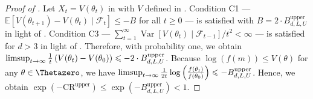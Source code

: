 \documentclass[journal]{IEEEtran}
\providecommand{\limsup}{\operatornamewithlimits{limsup}} %
\DeclareMathOperator{\Var}{Var}   %
\providecommand{\E}{\mathbb{E}} %
\renewcommand{\geq}{\geqslant} %
\renewcommand{\leq}{\leqslant} %
\theoremstyle{definition}
\begin{document}
\begin{proof}[Proof of ]
Let $X_t = V(\theta_t)$ in  with $V$ defined in .
Condition C1 --- $\E[V(\theta_{t+1}) - V(\theta_t)\mid\mathcal{F}_t]\leq -B$ for all $t\geq 0$ --- is satisfied with $B = 2\cdot B_{d, L, U}^\mathrm{upper}$ in light of .
Condition C3 --- $\sum_{t=1}^{\infty}\Var[V(\theta_{t}) \mid \mathcal{F}_{t-1}] / t^2 < \infty$ --- is satisfied for $d>3$ in light of .
Therefore, with probability one, we obtain
$\limsup_{t \to \infty} \frac{1}{t} \left( V(\theta_t) - V(\theta_0) \right) \leq - 2\cdot B_{d, L, U}^\mathrm{upper}$.
Because $\log(f(m)) \leq V(\theta)$ for any $\theta \in \Thetazero$, we have
$\limsup_{t \to \infty} \frac{1}{2 t} \log\left(\frac{f(\theta_t)}{f(\theta_0)}\right) \leq - B_{d, L, U}^\mathrm{upper}$.
Hence, we obtain $\exp(-\mathrm{CR}^\text{upper}) \leq \exp(- B_{d, L, U}^\mathrm{upper}) < 1$.
\end{proof}
\end{document}
